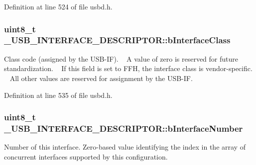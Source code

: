 Definition at line 524 of file usbd.\+h.

\subsubsection[{\texorpdfstring{b\+Interface\+Class}{bInterfaceClass}}]{\setlength{\rightskip}{0pt plus 5cm}uint8\+\_\+t \+\_\+\+U\+S\+B\+\_\+\+I\+N\+T\+E\+R\+F\+A\+C\+E\+\_\+\+D\+E\+S\+C\+R\+I\+P\+T\+O\+R\+::b\+Interface\+Class}\hypertarget{struct__USB__INTERFACE__DESCRIPTOR_a21d6fc8a0a868dc4061084f9d0f62684}{}\label{struct__USB__INTERFACE__DESCRIPTOR_a21d6fc8a0a868dc4061084f9d0f62684}
Class code (assigned by the U\+S\+B-\/\+IF). ~\newline
A value of zero is reserved for future standardization. ~\newline
If this field is set to F\+FH, the interface class is vendor-\/specific. ~\newline
All other values are reserved for assignment by the U\+S\+B-\/\+IF. 

Definition at line 535 of file usbd.\+h.

\subsubsection[{\texorpdfstring{b\+Interface\+Number}{bInterfaceNumber}}]{\setlength{\rightskip}{0pt plus 5cm}uint8\+\_\+t \+\_\+\+U\+S\+B\+\_\+\+I\+N\+T\+E\+R\+F\+A\+C\+E\+\_\+\+D\+E\+S\+C\+R\+I\+P\+T\+O\+R\+::b\+Interface\+Number}\hypertarget{struct__USB__INTERFACE__DESCRIPTOR_a1cd05be188c8776aaa33029e0e7e8c32}{}\label{struct__USB__INTERFACE__DESCRIPTOR_a1cd05be188c8776aaa33029e0e7e8c32}
Number of this interface. Zero-\/based value identifying the index in the array of concurrent interfaces supported by this configuration. 

